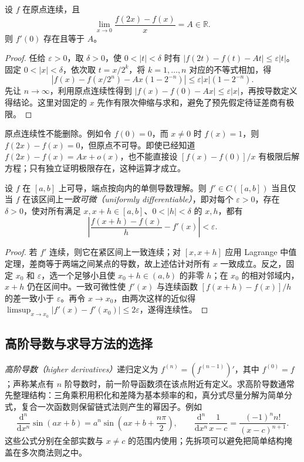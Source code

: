 \begin{proposition}
\label{prop:pei-diff-dyadic-derivative}
设 $f$ 在原点连续，且
\[
 \lim_{x\to0}\frac{f(2x)-f(x)}{x}=A\in\mathbb R.
\]
则 $f'(0)$ 存在且等于 $A$。
\end{proposition}
\begin{proof}
任给 $\varepsilon>0$，取 $\delta>0$，使 $0<|t|<\delta$ 时有
$|f(2t)-f(t)-At|\le\varepsilon|t|$。固定 $0<|x|<\delta$，依次取 $t=x/2^k$，将 $k=1,\ldots,n$ 对应的不等式相加，得
\[
 \left|f(x)-f(x/2^n)-Ax(1-2^{-n})\right|
 \le\varepsilon|x|(1-2^{-n}).
\]
先让 $n\to\infty$，利用原点连续性得到
$|f(x)-f(0)-Ax|\le\varepsilon|x|$，再按导数定义得结论。这里对固定的 $x$ 先作有限次伸缩与求和，避免了预先假定待证差商有极限。
\end{proof}

\begin{remark}
原点连续性不能删除。例如令 $f(0)=0$，而 $x\ne0$ 时 $f(x)=1$，则 $f(2x)-f(x)=0$，但原点不可导。即使已经知道 $f(2x)-f(x)=Ax+o(x)$，也不能直接设 $[f(x)-f(0)]/x$ 有极限后解方程；只有独立证明极限存在，这种运算才成立。
\end{remark}

\begin{proposition}
\label{prop:pei-diff-uniform-differentiability}
设 $f$ 在 $[a,b]$ 上可导，端点按向内的单侧导数理解。则 $f'\in C([a,b])$ 当且仅当 $f$ 在该区间上\emph{一致可微（uniformly differentiable）}，即对每个 $\varepsilon>0$，存在 $\delta>0$，使对所有满足 $x,x+h\in[a,b]$、$0<|h|<\delta$ 的 $x,h$，都有
\[
 \left|\frac{f(x+h)-f(x)}h-f'(x)\right|<\varepsilon.
\]
\end{proposition}
\begin{proof}
若 $f'$ 连续，则它在紧区间上一致连续；对 $[x,x+h]$ 应用 Lagrange 中值定理，差商等于两端之间某点的导数，故上述估计对所有 $x$ 一致成立。反之，固定 $x_0$ 和 $\varepsilon$，选一个足够小且使 $x_0+h\in(a,b)$ 的非零 $h$；在 $x_0$ 的相对邻域内，$x+h$ 仍在区间中。一致可微性使 $f'(x)$ 与连续函数 $[f(x+h)-f(x)]/h$ 的差一致小于 $\varepsilon$。再令 $x\to x_0$，由两次这样的近似得 $\limsup_{x\to x_0}|f'(x)-f'(x_0)|\le2\varepsilon$，遂得连续性。
\end{proof}

\subsection{高阶导数与求导方法的选择}

\emph{高阶导数（higher derivatives）}递归定义为 $f^{(n)}=(f^{(n-1)})'$，其中 $f^{(0)}=f$；声称某点有 $n$ 阶导数时，前一阶导函数须在该点附近有定义。求高阶导数通常先整理结构：三角乘积用积化和差降为基本频率的和，真分式尽量分解为简单分式，复合一次函数则保留链式法则产生的幂因子。例如
\[
 \frac{\mathrm d^n}{\mathrm dx^n}\sin(ax+b)
 =a^n\sin\left(ax+b+\frac{n\pi}{2}\right),\qquad
 \frac{\mathrm d^n}{\mathrm dx^n}\frac1{x-c}
 =\frac{(-1)^n n!}{(x-c)^{n+1}}.
\]
这些公式分别在全部实数与 $x\ne c$ 的范围内使用；先拆项可以避免把简单结构掩盖在多次商法则之中。

